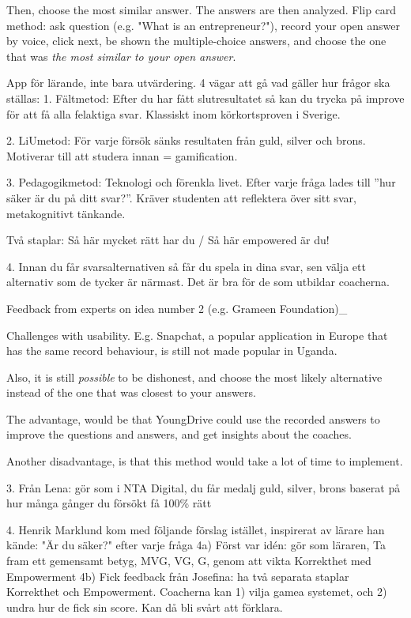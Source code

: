 Then, choose the most similar answer. The answers are then analyzed.
Flip card method: ask question (e.g. "What is an entrepreneur?"), record your open answer by voice, click next, be shown the multiple-choice answers, and choose the one that was \textit{the most similar to your open answer}.

App för lärande, inte bara utvärdering.
4 vägar att gå vad gäller hur frågor ska ställas:
1. Fältmetod: Efter du har fått slutresultatet så kan du trycka på improve för att få alla felaktiga svar. Klassiskt inom körkortsproven i Sverige.

2. LiUmetod: För varje försök sänks resultaten från guld, silver och brons. Motiverar till att studera innan = gamification.

3. Pedagogikmetod: Teknologi och förenkla livet. Efter varje fråga lades till ”hur säker är du på ditt svar?”. Kräver studenten att reflektera över sitt svar, metakognitivt tänkande.

Två staplar:
Så här mycket rätt har du / Så här empowered är du!

4. Innan du får svarsalternativen så får du spela in dina svar, sen välja ett alternativ som de tycker är närmast. Det är bra för de som utbildar coacherna.

Feedback from experts on idea number 2 (e.g. Grameen Foundation)_

Challenges with usability. E.g. Snapchat, a popular application in Europe that has the same record behaviour, is still not made popular in Uganda.

Also, it is still \textit{possible} to be dishonest, and choose the most likely alternative instead of the one that was closest to your answers.

The advantage, would be that YoungDrive could use the recorded answers to improve the questions and answers, and get insights about the coaches.

Another disadvantage, is that this method would take a lot of time to implement.

3. Från Lena: gör som i NTA Digital, du får medalj guld, silver, brons baserat på hur många gånger du försökt få 100\% rätt

4. Henrik Marklund kom med följande förslag istället, inspirerat av lärare han kände: "Är du säker?" efter varje fråga
4a) Först var idén: gör som läraren, Ta fram ett gemensamt betyg, MVG, VG, G, genom att vikta Korrekthet med Empowerment
4b) Fick feedback från Josefina: ha två separata staplar Korrekthet och Empowerment. Coacherna kan 1) vilja gamea systemet, och 2) undra hur de fick sin score. Kan då bli svårt att förklara.

